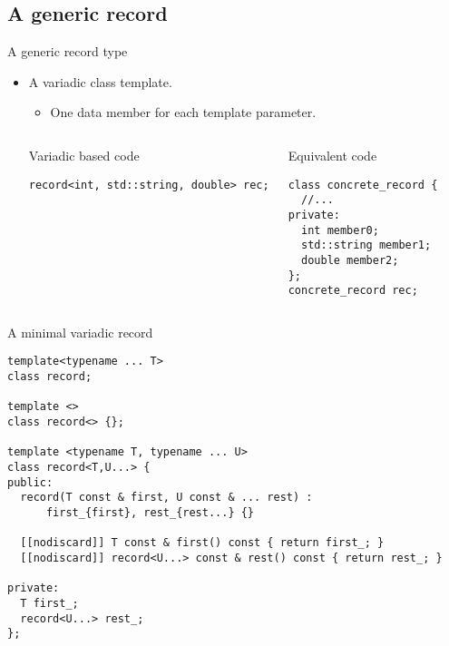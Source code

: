 \subsection{A generic record}

\begin{frame}[t,fragile]{A generic record type}
\begin{itemize}
  \item A variadic class template.
    \begin{itemize}
      \item One data member for each template parameter.
    \end{itemize}

\begin{columns}[T]

\begin{block}{Variadic based code}
\begin{lstlisting}
record<int, std::string, double> rec;
\end{lstlisting}
\end{block}

\begin{block}{Equivalent code}
\begin{lstlisting}
class concrete_record {
  //...
private:
  int member0;
  std::string member1;
  double member2;
};
concrete_record rec;
\end{lstlisting}
\end{block}

\end{columns}

\end{itemize}
\end{frame}

\begin{frame}[t,fragile]
\begin{block}{A minimal variadic record}
\begin{lstlisting}
template<typename ... T>
class record;

template <>
class record<> {};

template <typename T, typename ... U>
class record<T,U...> {
public:
  record(T const & first, U const & ... rest) :
      first_{first}, rest_{rest...} {}

  [[nodiscard]] T const & first() const { return first_; }
  [[nodiscard]] record<U...> const & rest() const { return rest_; }

private:
  T first_;
  record<U...> rest_;
};
\end{lstlisting}
\end{block}
\end{frame}

